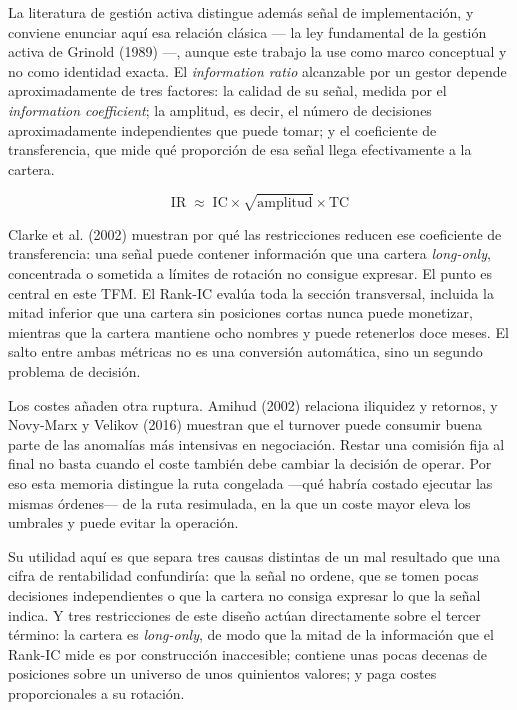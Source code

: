 La literatura de gestión activa distingue además señal de implementación, y conviene enunciar aquí
esa relación clásica --- la ley fundamental de la gestión activa de Grinold (1989) ---, aunque este
trabajo la use como marco conceptual y no como identidad exacta. El \textit{information ratio}
alcanzable por un gestor depende aproximadamente de tres factores: la calidad de su señal, medida
por el \textit{information coefficient}; la amplitud, es decir, el número de decisiones
aproximadamente independientes que puede tomar; y el coeficiente de transferencia, que mide qué
proporción de esa señal llega efectivamente a la cartera.

\[
  \text{IR} \;\approx\; \text{IC} \times \sqrt{\text{amplitud}} \times \text{TC}
\]

Clarke et al. (2002) muestran por qué las restricciones reducen ese coeficiente de transferencia:
una señal puede contener información que una cartera \textit{long-only}, concentrada o sometida a
límites de rotación no consigue expresar. El punto es central en este TFM. El Rank-IC evalúa toda la
sección transversal, incluida la mitad inferior que una cartera sin posiciones cortas nunca puede
monetizar, mientras que la cartera mantiene ocho nombres y puede retenerlos doce meses. El salto
entre ambas métricas no es una conversión automática, sino un segundo problema de decisión.

Los costes añaden otra ruptura. Amihud (2002) relaciona iliquidez y retornos, y Novy-Marx y Velikov
(2016) muestran que el turnover puede consumir buena parte de las anomalías más intensivas en
negociación. Restar una comisión fija al final no basta cuando el coste también debe cambiar la
decisión de operar. Por eso esta memoria distingue la ruta congelada ---qué habría costado ejecutar
las mismas órdenes--- de la ruta resimulada, en la que un coste mayor eleva los umbrales y puede
evitar la operación.

Su utilidad aquí es que separa tres causas distintas de un mal resultado que una cifra de
rentabilidad confundiría: que la señal no ordene, que se tomen pocas decisiones independientes o que
la cartera no consiga expresar lo que la señal indica. Y tres restricciones de este diseño actúan
directamente sobre el tercer término: la cartera es \textit{long-only}, de modo que la mitad de la
información que el Rank-IC mide es por construcción inaccesible; contiene unas pocas decenas de
posiciones sobre un universo de unos quinientos valores; y paga costes proporcionales a su rotación.


